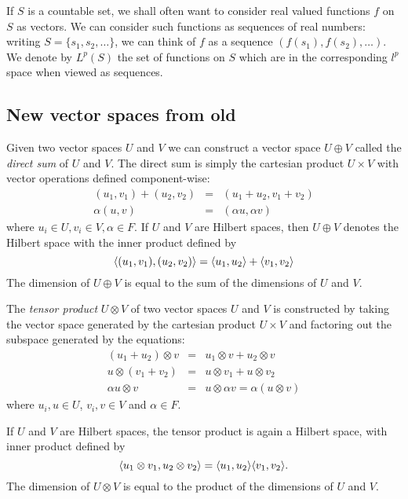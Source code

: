 \documentclass[12pt]{report}
\begin{document}
If $S$ is a countable set, we shall often want to consider real valued functions $f$ on $S$ as vectors. We can consider such functions as sequences of real numbers: writing $S = \{s_1, s_2, \ldots\}$, we can think of $f$ as a sequence $(f(s_1), f(s_2), \ldots)$. We denote by $L^p(S)$ the set of functions on $S$ which are in the corresponding $l^p$ space when viewed as sequences.

\subsection{New vector spaces from old}
\begin{defn}
Given two vector spaces $U$ and $V$ we can construct a vector space $U \oplus V$ called the \emph{direct sum} of $U$ and $V$. The direct sum is simply the cartesian product $U \times V$ with vector operations defined component-wise:
\begin{eqnarray*}
(u_1,v_1) + (u_2,v_2) & = & (u_1+u_2,v_1+v_2)\\
\alpha(u,v) & = & (\alpha u, \alpha v)
\end{eqnarray*}
where $u_i \in U, v_i \in V, \alpha \in F$. If $U$ and $V$ are Hilbert spaces, then $U \oplus V$ denotes the Hilbert space with the inner product defined by
$$\langle (u_1,v_1), (u_2,v_2) \rangle = \langle u_1, u_2 \rangle + \langle v_1, v_2 \rangle$$
The dimension of $U\oplus V$ is equal to the sum of the dimensions of $U$ and $V$.
\end{defn}
\begin{defn}

The \emph{tensor product} $U \otimes V$ of two vector spaces $U$ and $V$ is constructed by taking the vector space generated by the cartesian product $U \times V$ and factoring out the subspace generated by the equations:
\begin{eqnarray*}
(u_1 + u_2) \otimes v & = & u_1 \otimes v + u_2 \otimes v\\
u \otimes (v_1 + v_2) & = & u \otimes v_1 + u \otimes v_2\\
\alpha u\otimes v & =  &u \otimes \alpha v = \alpha(u \otimes v) 
\end{eqnarray*}
where $u_i,u \in U$, $v_i,v \in V$ and $\alpha \in F$.

If $U$ and $V$ are Hilbert spaces, the tensor product is again a Hilbert space, with inner product defined by
$$\langle u_1\otimes v_1, u_2 \otimes v_2 \rangle = \langle u_1, u_2 \rangle\langle v_1, v_2 \rangle.$$
The dimension of $U \otimes V$ is equal to the product of the dimensions of $U$ and $V$.
\end{defn}
\end{document}
